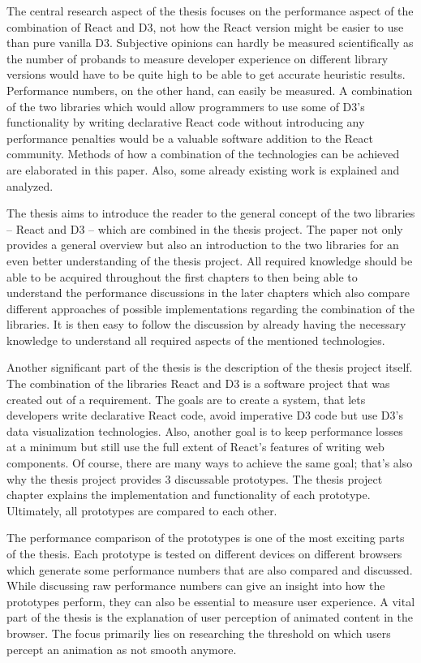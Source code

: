 The central research aspect of the thesis focuses on the performance aspect of the combination of React and D3, not how the React version might be easier to use than pure vanilla D3. Subjective opinions can hardly be measured scientifically as the number of probands to measure developer experience on different library versions would have to be quite high to be able to get accurate heuristic results. Performance numbers, on the other hand, can easily be measured. A combination of the two libraries which would allow programmers to use some of D3's functionality by writing declarative React code without introducing any performance penalties would be a valuable software addition to the React community. Methods of how a combination of the technologies can be achieved are elaborated in this paper. Also, some already existing work is explained and analyzed.

The thesis aims to introduce the reader to the general concept of the two libraries -- React and D3 -- which are combined in the thesis project. The paper not only provides a general overview but also an introduction to the two libraries for an even better understanding of the thesis project. All required knowledge should be able to be acquired throughout the first chapters to then being able to understand the performance discussions in the later chapters which also compare different approaches of possible implementations regarding the combination of the libraries. It is then easy to follow the discussion by already having the necessary knowledge to understand all required aspects of the mentioned technologies.

Another significant part of the thesis is the description of the thesis project itself. The combination of the libraries React and D3 is a software project that was created out of a requirement. The goals are to create a system, that lets developers write declarative React code, avoid imperative D3 code but use D3's data visualization technologies. Also, another goal is to keep performance losses at a minimum but still use the full extent of React's features of writing web components. Of course, there are many ways to achieve the same goal; that's also why the thesis project provides 3 discussable prototypes. The thesis project chapter explains the implementation and functionality of each prototype. Ultimately, all prototypes are compared to each other.

The performance comparison of the prototypes is one of the most exciting parts of the thesis. Each prototype is tested on different devices on different browsers which generate some performance numbers that are also compared and discussed. While discussing raw performance numbers can give an insight into how the prototypes perform, they can also be essential to measure user experience. A vital part of the thesis is the explanation of user perception of animated content in the browser. The focus primarily lies on researching the threshold on which users percept an animation as not smooth anymore.


